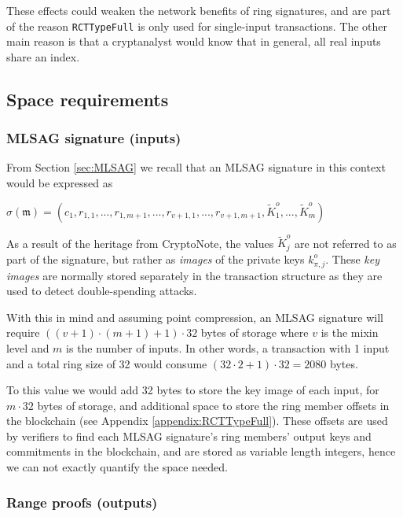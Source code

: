 These effects could weaken the network benefits of ring signatures, and are part of the reason {\tt RCTTypeFull} is only used for single-input transactions. The other main reason is that a cryptanalyst would know that in general, all real inputs share an index.


\subsection{Space requirements}

\subsubsection*{MLSAG signature (inputs)}

From Section \ref{sec:MLSAG} we recall that an MLSAG signature in this context would be expressed as

\hfill \(\sigma(\mathfrak{m}) = (c_1, r_{1, 1}, ..., r_{1, m+1}, ..., r_{v+1, 1}, ..., r_{v+1, m+1}, \tilde{K}^o_1, ..., \tilde{K}^o_m) \) \hfill \phantom{.}

As a result of the heritage from CryptoNote, the values \(\tilde{K}^o_j\) are not referred to as part of the signature, but rather as {\em images} of the private keys $k^o_{\pi,j}$. These {\em key images} are normally stored separately in the transaction structure as they are used to detect double-spending attacks.

With this in mind and assuming point compression, an MLSAG signature will require $((v + 1) \cdot (m + 1) + 1) \cdot 32$ bytes of storage where $v$ is the mixin level and $m$ is the number of inputs. In other words, a transaction with 1 input and a total ring size of 32 would consume $(32 \cdot 2 + 1) \cdot 32 = 2080$ bytes.

To this value we would add 32 bytes to store the key image of each input, for $m \cdot 32$ bytes of storage, and additional space to store the ring member offsets in the blockchain (see Appendix \ref{appendix:RCTTypeFull}). These offsets are used by verifiers to find each MLSAG signature's ring members' output keys and commitments in the blockchain, and are stored as variable length integers, hence we can not exactly quantify the space needed.


\subsubsection*{Range proofs (outputs)}
\label{range-proofs-space}

